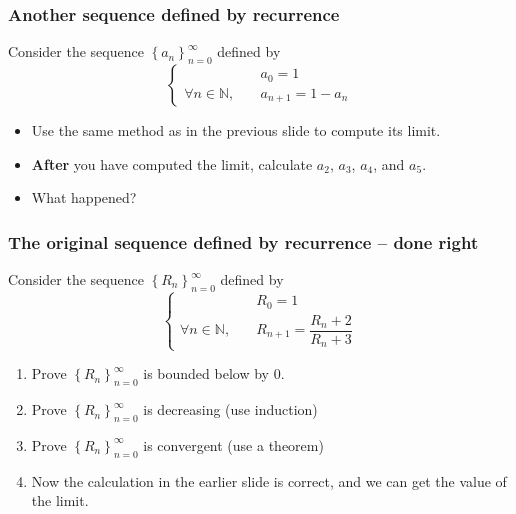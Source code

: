 \documentclass[14pt]{beamer}
\newcommand {\DS} [1] {${\displaystyle #1}$}
\newcommand {\N}{\mathbb{N}}
\newcommand{\an}{\left\{ a_n \right\}_{n=0}^{\infty}}
\newcommand{\Rn}{\left\{ R_n \right\}_{n=0}^{\infty}}
\begin{document}
\begin{frame}[t]
\frametitle{Another sequence defined by recurrence}
Consider the sequence \DS{\an} defined by
	\begin{equation*}
		\begin{cases}
			&a_0 = 1 \\
			 \forall n \in \N, \quad & a_{n+1} = 1 - a_n
		\end{cases}
	\end{equation*}

\begin{itemize}
	\item Use the same method as in the previous slide to compute its limit.
	\item {\bf After} you have computed the limit, calculate $a_2$, $a_3$, $a_4$, and $a_5$.
	\item What happened?
\end{itemize}

\end{frame}
\begin{frame}[t]
\frametitle{The original sequence defined by recurrence --  done right}

Consider the sequence \DS{\Rn} defined by
	\begin{equation*}
		\begin{cases}
			&R_0 = 1 \\
			 \forall n \in \N, \quad & R_{n+1} = \dfrac{ R_n + 2}{R_n + 3}
		\end{cases}
	\end{equation*}

\begin{enumerate}
	\item Prove \DS{\Rn} is bounded below by 0.
	\item Prove \DS{\Rn} is decreasing (use induction)
	\item Prove \DS{\Rn} is convergent (use a theorem)
	\item Now the calculation in the earlier slide is correct, and we can get the value of the limit.
\end{enumerate}


\end{frame}
\end{document}
